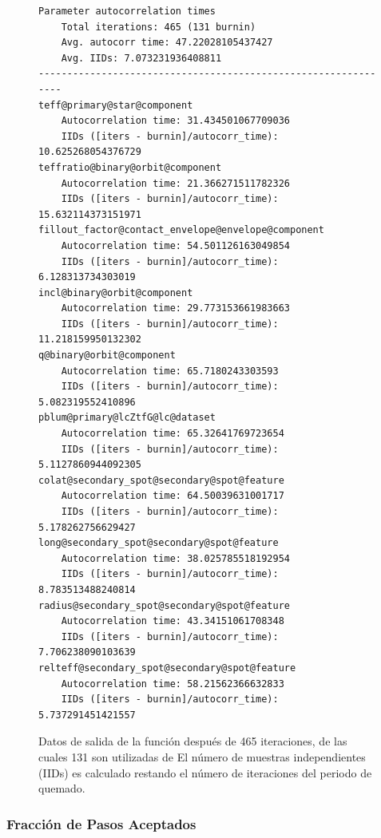 \begin{figure}[!ht]
	\centering
\begin{lstlisting}
Parameter autocorrelation times 
	Total iterations: 465 (131 burnin) 
	Avg. autocorr time: 47.22028105437427 
	Avg. IIDs: 7.073231936408811
---------------------------------------------------------------
teff@primary@star@component
	Autocorrelation time: 31.434501067709036
	IIDs ([iters - burnin]/autocorr_time): 10.625268054376729
teffratio@binary@orbit@component
	Autocorrelation time: 21.366271511782326
	IIDs ([iters - burnin]/autocorr_time): 15.632114373151971
fillout_factor@contact_envelope@envelope@component
	Autocorrelation time: 54.501126163049854
	IIDs ([iters - burnin]/autocorr_time): 6.128313734303019
incl@binary@orbit@component
	Autocorrelation time: 29.773153661983663
	IIDs ([iters - burnin]/autocorr_time): 11.218159950132302
q@binary@orbit@component
	Autocorrelation time: 65.7180243303593
	IIDs ([iters - burnin]/autocorr_time): 5.082319552410896
pblum@primary@lcZtfG@lc@dataset
	Autocorrelation time: 65.32641769723654
	IIDs ([iters - burnin]/autocorr_time): 5.1127860944092305
colat@secondary_spot@secondary@spot@feature
	Autocorrelation time: 64.50039631001717
	IIDs ([iters - burnin]/autocorr_time): 5.178262756629427
long@secondary_spot@secondary@spot@feature
	Autocorrelation time: 38.025785518192954
	IIDs ([iters - burnin]/autocorr_time): 8.783513488240814
radius@secondary_spot@secondary@spot@feature
	Autocorrelation time: 43.34151061708348
	IIDs ([iters - burnin]/autocorr_time): 7.706238090103639
relteff@secondary_spot@secondary@spot@feature
	Autocorrelation time: 58.21562366632833
	IIDs ([iters - burnin]/autocorr_time): 5.737291451421557
\end{lstlisting}
	\caption{Datos de salida de la función 
	después de 465 iteraciones, de las cuales 131 son utilizadas de
	 El número de muestras independientes (IIDs) es calculado
	restando el número de iteraciones del periodo de quemado.}
	\label{codigoParamAutoCorrSalida}
\end{figure}

\subsubsection{Fracción de Pasos Aceptados}

